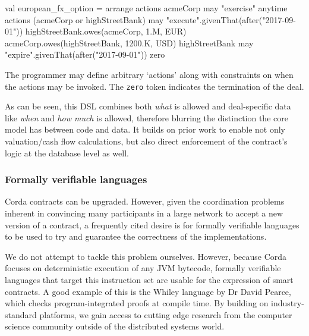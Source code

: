 \documentclass{article}
\begin{document}
\begin{kotlincode}
    val european_fx_option = arrange {
        actions {
            acmeCorp may {
                "exercise" anytime {
                    actions {
                        (acmeCorp or highStreetBank) may {
                            "execute".givenThat(after("2017-09-01")) {
                                highStreetBank.owes(acmeCorp, 1.M, EUR)
                                acmeCorp.owes(highStreetBank, 1200.K, USD)
                            }
                        }
                    }
                }
            }
            highStreetBank may {
                "expire".givenThat(after("2017-09-01")) {
                    zero
                }
            }
        }
    }
\end{kotlincode}

The programmer may define arbitrary `actions' along with constraints on when the actions may be invoked. The
\texttt{zero} token indicates the termination of the deal.

As can be seen, this DSL combines both \emph{what} is allowed and deal-specific data like \emph{when} and \emph{how
much} is allowed, therefore blurring the distinction the core model has between code and data. It builds on prior
work to enable not only valuation/cash flow calculations, but also direct enforcement of the contract's logic at
the database level as well.

\subsubsection{Formally verifiable languages}

Corda contracts can be upgraded. However, given the coordination problems inherent in convincing many participants
in a large network to accept a new version of a contract, a frequently cited desire is for formally verifiable
languages to be used to try and guarantee the correctness of the implementations.

We do not attempt to tackle this problem ourselves. However, because Corda focuses on deterministic execution of
any JVM bytecode, formally verifiable languages that target this instruction set are usable for the expression
of smart contracts. A good example of this is the Whiley language by Dr David Pearce\cite{Pearce2015191}, which
checks program-integrated proofs at compile time. By building on industry-standard platforms, we gain access to
cutting edge research from the computer science community outside of the distributed systems world.
\end{document}
